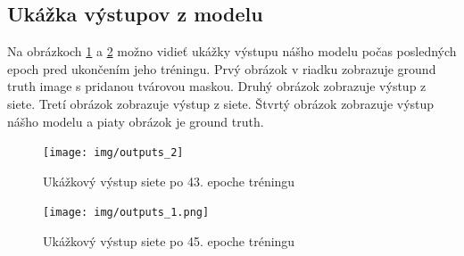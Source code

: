\documentclass [11pt, a4paper]{article}
\begin{document}
	
	\newpage
	\renewcommand{\refname}{Zdroje}
	
	
	\newpage
	\begin{appendices}
		\section{Ukážka výstupov z modelu}
		Na obrázkoch \ref{fig:output_2} a \ref{fig:output_1} možno vidieť ukážky výstupu nášho modelu počas posledných epoch pred ukončením jeho tréningu. Prvý obrázok v riadku zobrazuje ground truth image s pridanou tvárovou maskou. Druhý obrázok zobrazuje výstup z  siete. Tretí obrázok zobrazuje výstup z  siete. Štvrtý obrázok zobrazuje výstup nášho modelu a piaty obrázok je ground truth.
		
		\begin{figure}[h]
			\centering
			\texttt{[image: img/outputs\_2]}
			\caption{Ukážkový výstup siete po 43. epoche tréningu}
			\label{fig:output_2}
		\end{figure}
		
		\begin{figure}[h]
			\centering
			\texttt{[image: img/outputs\_1.png]}
			\caption{Ukážkový výstup siete po 45. epoche tréningu}
			\label{fig:output_1}
		\end{figure}
		
	\end{appendices}
	
\end{document}
